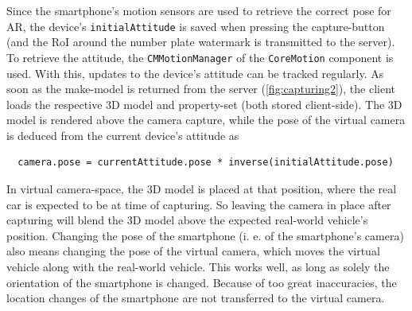 Since the smartphone's motion sensors are used to retrieve the correct pose for AR, the device's \texttt{initialAttitude} is saved when pressing the capture-button (and the RoI around the number plate watermark is transmitted to the server). To retrieve the attitude, the \texttt{CMMotionManager} of the \texttt{CoreMotion} component is used. With this, updates to the device's attitude can be tracked regularly. As soon as the make-model is returned from the server (\ref{fig:capturing2}), the client loads the respective 3D model and property-set (both stored client-side). The 3D model is rendered above the camera capture, while the pose of the virtual camera is deduced from the current device's attitude as
\begin{verbatim}
  camera.pose = currentAttitude.pose * inverse(initialAttitude.pose)
\end{verbatim}
In virtual camera-space, the 3D model is placed at that position, where the real car is expected to be at time of capturing. So leaving the camera in place after capturing will blend the 3D model above the expected real-world vehicle's position. Changing the pose of the smartphone (i. e. of the smartphone's camera) also means changing the pose of the virtual camera, which moves the virtual vehicle along with the real-world vehicle. This works well, as long as solely the orientation of the smartphone is changed. Because of too great inaccuracies, the location changes of the smartphone are not transferred to the virtual camera.

